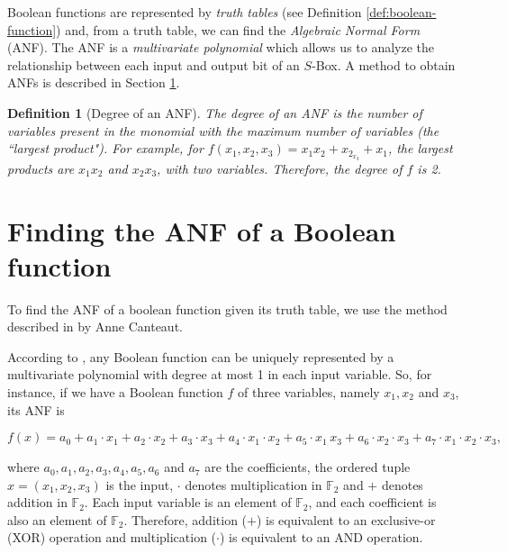 \documentclass{report}
\newtheorem{definition}{Definition}{\bfseries}{\itshape}
\begin{document}
Boolean functions are represented by \emph{truth tables} (see Definition \ref{def:boolean-function}) and, from a truth table, we can find the \emph{Algebraic Normal Form} (ANF). The ANF is a \emph{multivariate polynomial} which allows us to analyze the relationship between each input and output bit of an $S$-Box. A method to obtain ANFs is described in Section \ref{sec:finding-anf}.


\begin{definition}[Degree of an ANF]
The degree of an ANF is the number of variables present in the monomial with the maximum number of variables (the ``largest product"). For example, for $f(x_1, x_2, x_3) = x_1x_2 + x_2_x_3 + x_1$, the largest products are $x_1x_2$ and $x_2x_3$, with two variables. Therefore, the degree of $f$ is 2.
\end{definition}

\section{Finding the ANF of a Boolean function}\label{sec:finding-anf}

To find the ANF of a boolean function given its truth table, we use the method described in \cite{Anne2016} by Anne Canteaut.

According to \cite{Anne2016}, any Boolean function can be uniquely represented by a multivariate polynomial with degree at most 1 in each input variable. So, for instance, if we have a Boolean function $f$ of three variables, namely $x_1, x_2$ and $x_3$, its ANF is

\begin{equation*}
    f(x) = a_0 + a_1 \cdot x_1 + a_2 \cdot x_2 + a_3 \cdot x_3 + a_4 \cdot x_1 \cdot x_2 + a_5 \cdot x_1_ \cdot x_3 + a_6 \cdot x_2 \cdot x_3 + a_7 \cdot x_1 \cdot x_2 \cdot x_3,
\end{equation*}

where $a_0, a_1, a_2, a_3, a_4, a_5, a_6$ and $a_7$ are the coefficients, the ordered tuple $x = (x_1, x_2, x_3)$ is the input, $\cdot$ denotes multiplication in $\mathbb{F}_2$ and $+$ denotes addition in $\mathbb{F}_2$. Each input variable is an element of $\mathbb{F}_2$, and each coefficient is also an element of $\mathbb{F}_2$. Therefore, addition ($+$) is equivalent to an exclusive-or (XOR) operation and multiplication ($\cdot$) is equivalent to an AND operation.
\end{document}
